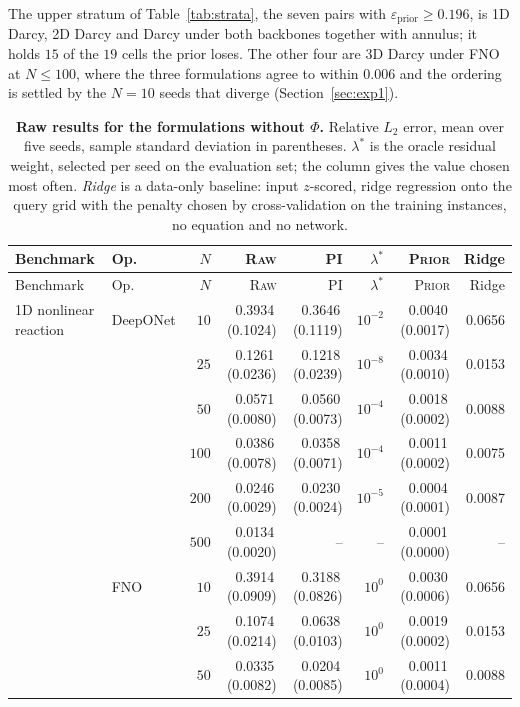 \documentclass{article}
\newcommand{\armraw}{\textsc{Raw}}
\newcommand{\armpi}{\textsc{PI}}
\newcommand{\armprior}{\textsc{Prior}}
\begin{document}
The upper stratum of Table~\ref{tab:strata}, the seven pairs with
$\varepsilon_{\mathrm{prior}}\ge0.196$, is 1D Darcy, 2D Darcy and Darcy \citep{li2020fourier}
under both backbones together with annulus; it holds $15$ of the $19$
cells the prior loses. The other four are 3D Darcy under \textsc{FNO} at $N\le100$, where the three
formulations agree to within $0.006$ and the ordering is settled by the $N{=}10$ seeds that diverge
(Section~\ref{sec:exp1}).

{
\setlength{\LTcapwidth}{\textwidth}
\setlength{\tabcolsep}{2pt}
\begin{longtable}{llrrrrrr}
\caption{\textbf{Raw results for the formulations without $\Phi$.} Relative $L_2$ error, mean over
five seeds, sample standard deviation in parentheses. $\lambda^\ast$ is the oracle residual weight,
selected per seed on the evaluation set; the column gives the value chosen most often.
\emph{Ridge} is a data-only baseline: input $z$-scored, ridge regression onto the query grid with
the penalty chosen by cross-validation on the training instances, no equation and no network.}
\label{tab:app-e1-raw}\\
\toprule
Benchmark & Op. & $N$ & \armraw & \armpi & $\lambda^\ast$ & \armprior & Ridge\\
\midrule
\endfirsthead
\toprule
Benchmark & Op. & $N$ & \armraw & \armpi & $\lambda^\ast$ & \armprior & Ridge\\
\midrule
\endhead
\bottomrule
\endfoot
1D nonlinear reaction & DeepONet & $10$ & 0.3934\,(0.1024) & 0.3646\,(0.1119) & $10^{-2}$ & 0.0040\,(0.0017) & 0.0656\\
 &  & $25$ & 0.1261\,(0.0236) & 0.1218\,(0.0239) & $10^{-8}$ & 0.0034\,(0.0010) & 0.0153\\
 &  & $50$ & 0.0571\,(0.0080) & 0.0560\,(0.0073) & $10^{-4}$ & 0.0018\,(0.0002) & 0.0088\\
 &  & $100$ & 0.0386\,(0.0078) & 0.0358\,(0.0071) & $10^{-4}$ & 0.0011\,(0.0002) & 0.0075\\
 &  & $200$ & 0.0246\,(0.0029) & 0.0230\,(0.0024) & $10^{-5}$ & 0.0004\,(0.0001) & 0.0087\\
 &  & $500$ & 0.0134\,(0.0020) & -- & -- & 0.0001\,(0.0000) & --\\
 & FNO & $10$ & 0.3914\,(0.0909) & 0.3188\,(0.0826) & $10^{0}$ & 0.0030\,(0.0006) & 0.0656\\
 &  & $25$ & 0.1074\,(0.0214) & 0.0638\,(0.0103) & $10^{0}$ & 0.0019\,(0.0002) & 0.0153\\
 &  & $50$ & 0.0335\,(0.0082) & 0.0204\,(0.0085) & $10^{0}$ & 0.0011\,(0.0004) & 0.0088\\

\end{longtable}}
\end{document}

